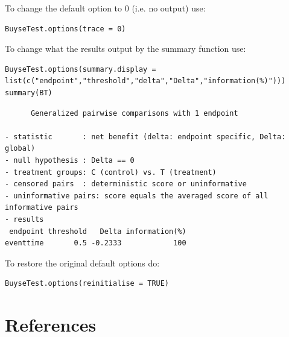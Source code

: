 \documentclass[12pt]{article}
\begin{document}
To change the default option to 0 (i.e. no output) use:
\lstset{language=r,label= ,caption= ,captionpos=b,numbers=none}
\begin{lstlisting}
BuyseTest.options(trace = 0)
\end{lstlisting}

To change what the results output by the summary function use:
\lstset{language=r,label= ,caption= ,captionpos=b,numbers=none}
\begin{lstlisting}
BuyseTest.options(summary.display = list(c("endpoint","threshold","delta","Delta","information(%)")))
summary(BT)
\end{lstlisting}

\begin{verbatim}
      Generalized pairwise comparisons with 1 endpoint

- statistic       : net benefit (delta: endpoint specific, Delta: global) 
- null hypothesis : Delta == 0 
- treatment groups: C (control) vs. T (treatment) 
- censored pairs  : deterministic score or uninformative
- uninformative pairs: score equals the averaged score of all informative pairs
- results
 endpoint threshold   Delta information(%)
eventtime       0.5 -0.2333            100
\end{verbatim}


To restore the original default options do:
\lstset{language=r,label= ,caption= ,captionpos=b,numbers=none}
\begin{lstlisting}
BuyseTest.options(reinitialise = TRUE)
\end{lstlisting}

\clearpage


\section*{References}
\label{sec:orgdd1de91}
\begingroup
\renewcommand{\section}[2]{}




\endgroup
\end{document}
